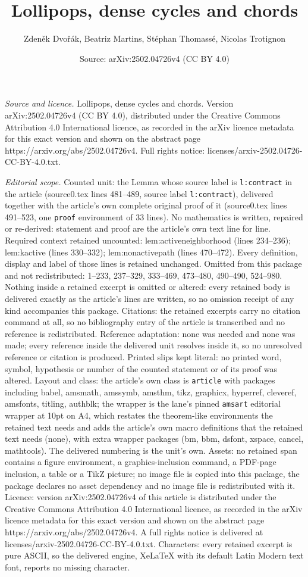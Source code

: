 \documentclass[10pt,a4paper]{amsart}
\title[Lollipops, dense cycles and chords]{Lollipops, dense cycles and chords}
\author{Zden\v{e}k Dvo\v{r}\'ak, Beatriz Martins, St\'ephan Thomass\'e, Nicolas Trotignon}
\date{Source: arXiv:2502.04726v4 (CC BY 4.0)}
\begin{document}
\maketitle

\noindent\emph{Source and licence.} Lollipops, dense cycles and chords. Version arXiv:2502.04726v4 (CC BY 4.0), distributed under the Creative Commons Attribution 4.0 International licence, as recorded in the arXiv licence metadata for this exact version and shown on the abstract page https://arxiv.org/abs/2502.04726v4. Full rights notice: licenses/arxiv-2502.04726-CC-BY-4.0.txt.\par\smallskip

\noindent\textit{Editorial scope.} Counted unit: the Lemma whose source label is \texttt{l:contract} in the article (source0.tex lines 481--489, source label \texttt{l:contract}), delivered together with the article's own complete original proof of it (source0.tex lines 491--523, one \texttt{proof} environment of 33 lines). No mathematics is written, repaired or re-derived: statement and proof are the article's own text line for line. Required context retained uncounted: lem:activeneighborhood (lines 234--236); lem:kactive (lines 330--332); lem:nonactivepath (lines 470--472). Every definition, display and label of those lines is retained unchanged. Omitted from this package and not redistributed: 1--233, 237--329, 333--469, 473--480, 490--490, 524--980. Nothing inside a retained excerpt is omitted or altered: every retained body is delivered exactly as the article's lines are written, so no omission receipt of any kind accompanies this package. Citations: the retained excerpts carry no citation command at all, so no bibliography entry of the article is transcribed and no reference is redistributed. Reference adaptation: none was needed and none was made; every reference inside the delivered unit resolves inside it, so no unresolved reference or citation is produced. Printed slips kept literal: no printed word, symbol, hypothesis or number of the counted statement or of its proof was altered. Layout and class: the article's own class is \texttt{article} with packages including babel, amsmath, amssymb, amsthm, tikz, graphicx, hyperref, cleveref, amsfonts, titling, authblk; the wrapper is the lane's pinned \texttt{amsart} editorial wrapper at 10pt on A4, which restates the theorem-like environments the retained text needs and adds the article's own macro definitions that the retained text needs (none), with extra wrapper packages (bm, bbm, dsfont, xspace, cancel, mathtools). The delivered numbering is the unit's own. Assets: no retained span contains a figure environment, a graphics-inclusion command, a PDF-page inclusion, a table or a TikZ picture; no image file is copied into this package, the package declares no asset dependency and no image file is redistributed with it. Licence: version arXiv:2502.04726v4 of this article is distributed under the Creative Commons Attribution 4.0 International licence, as recorded in the arXiv licence metadata for this exact version and shown on the abstract page https://arxiv.org/abs/2502.04726v4. A full rights notice is delivered at licenses/arxiv-2502.04726-CC-BY-4.0.txt. Characters: every retained excerpt is pure ASCII, so the delivered engine, XeLaTeX with its default Latin Modern text font, reports no missing character.
\end{document}
